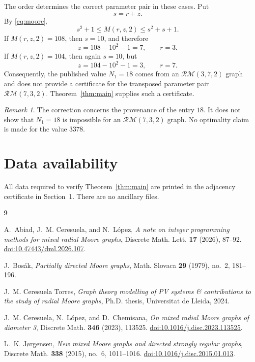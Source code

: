 \documentclass[11pt]{amsart}
\theoremstyle{remark}
\newtheorem{remark}[theorem]{Remark}
\newcommand{\RM}{\mathcal{RM}}
\begin{document}
The order determines the correct parameter pair in these cases. Put
\[
s=r+z.
\]
By \eqref{eq:moore},
\[
s^2+1\le M(r,z,2)\le s^2+s+1.
\]
If $M(r,z,2)=108$, then $s=10$, and therefore
\[
z=108-10^2-1=7,
\qquad
r=3.
\]
If $M(r,z,2)=104$, then again $s=10$, but
\[
z=104-10^2-1=3,
\qquad
r=7.
\]
Consequently, the published value $N_1=18$ comes from an
$\RM(3,7,2)$ graph and does not provide a certificate for the
transposed parameter pair $\RM(7,3,2)$. Theorem~\ref{thm:main}
supplies such a certificate.

\begin{remark}
The correction concerns the provenance of the entry $18$. It does not
show that $N_1=18$ is impossible for an $\RM(7,3,2)$ graph. No
optimality claim is made for the value $3378$.
\end{remark}

\section*{Data availability}

All data required to verify Theorem~\ref{thm:main} are printed in the
adjacency certificate in Section~1. There are no ancillary files.

\begin{thebibliography}{9}

A.~Abiad, J.~M. Ceresuela, and N.~L\'opez,
\emph{A note on integer programming methods for mixed radial Moore
graphs},
Discrete Math. Lett. \textbf{17} (2026), 87--92.
\href{https://doi.org/10.47443/dml.2026.107}
{doi:10.47443/dml.2026.107}.

J.~Bos\'ak,
\emph{Partially directed Moore graphs},
Math. Slovaca \textbf{29} (1979), no.~2, 181--196.

J.~M. Ceresuela Torres,
\emph{Graph theory modelling of PV systems \& contributions to the
study of radial Moore graphs},
Ph.D. thesis, Universitat de Lleida, 2024.

J.~M. Ceresuela, N.~L\'opez, and D.~Chemisana,
\emph{On mixed radial Moore graphs of diameter 3},
Discrete Math. \textbf{346} (2023), 113525.
\href{https://doi.org/10.1016/j.disc.2023.113525}
{doi:10.1016/j.disc.2023.113525}.

L.~K. J{\o}rgensen,
\emph{New mixed Moore graphs and directed strongly regular graphs},
Discrete Math. \textbf{338} (2015), no.~6, 1011--1016.
\href{https://doi.org/10.1016/j.disc.2015.01.013}
{doi:10.1016/j.disc.2015.01.013}.

\end{thebibliography}
\end{document}

